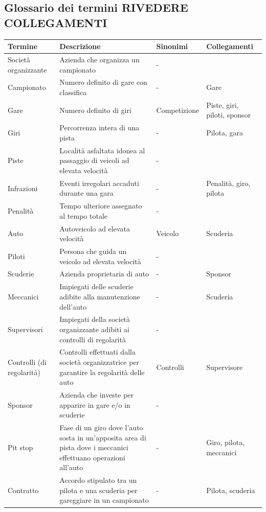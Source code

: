\documentclass[11pt]{article}
\begin{document}
\subsection{Glossario dei termini \textbf{RIVEDERE COLLEGAMENTI}}
\begin{tabularx}{\linewidth}{
        |>{\hsize=0.9\hsize}X|%
        >{\hsize=1.8\hsize}X|%
        >{\hsize=0.6\hsize}X|%
        >{\hsize=0.7\hsize}X|%
    }
    \hline
    \textbf{Termine} & \textbf{Descrizione} & \textbf{Sinonimi} & \textbf{Collegamenti} \\
    \hline
    Società organizzante & Azienda che organizza un campionato & - & \\
    \hline
    Campionato & Numero definito di gare con classifica & - & Gare \\
    \hline
    Gare & Numero definito di giri & Competizione & Piste, giri, piloti, sponsor \\
    \hline
    Giri & Percorrenza intera di una pista & - & Pilota, gara \\
    \hline
    Piste & Località asfaltata idonea al passaggio di veicoli ad elevata velocità & - & \\
    \hline
    Infrazioni & Eventi irregolari accaduti durante una gara & - & Penalità, giro, pilota \\
    \hline
    Penalità & Tempo ulteriore assegnato al tempo totale & - & \\
    \hline
    Auto & Autoveicolo ad elevata velocità & Veicolo & Scuderia \\
    \hline
    Piloti & Persona che guida un veicolo ad elevata velocità & - & \\
    \hline
    Scuderie & Azienda proprietaria di auto & - & Sponsor \\
    \hline
    Meccanici & Impiegati delle scuderie adibite alla manutenzione dell'auto & - & Scuderia \\
    \hline
    Supervisori & Impiegati della società organizzante adibiti ai controlli di regolarità & - & \\
    \hline
    Controlli (di regolarità) & Controlli effettuati dalla società organizzatrice per garantire la regolarità delle auto & Controlli & Supervisore \\
    \hline
    Sponsor & Azienda che investe per apparire in gare e/o in scuderie & - & \\
    \hline
    Pit stop & Fase di un giro dove l'auto sosta in un'apposita area di pista dove i meccanici effettuano operazioni all'auto & - & Giro, pilota, meccanici \\
    \hline
    Contratto & Accordo stipulato tra un pilota e una scuderia per gareggiare in un campionato & - & Pilota, scuderia \\
    \hline
\end{tabularx}    
\end{document}
